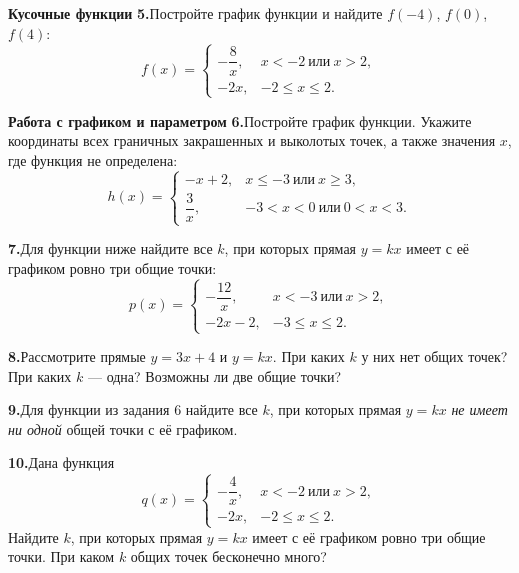 \documentclass[a4paper,12pt]{article}
\newcommand{\task}[2]{\needspace{6\baselineskip}\noindent\textbf{#1.}\enspace #2\par\vspace{9pt}}
\begin{document}
\textbf{Кусочные функции}
\task{5}{Постройте график функции и найдите \(f(-4)\), \(f(0)\), \(f(4)\):
\[
 f(x)=\begin{cases}
 -\dfrac8x,&x<-2\ \text{или}\ x>2,\\[4pt]
 -2x,&-2\le x\le2.
 \end{cases}
\]}

\clearpage
\textbf{Работа с графиком и параметром}
\task{6}{Постройте график функции. Укажите координаты всех граничных закрашенных и выколотых точек, а также значения \(x\), где функция не определена:
\[
 h(x)=\begin{cases}
 -x+2,&x\le-3\ \text{или}\ x\ge3,\\[4pt]
 \dfrac3x,&-3<x<0\ \text{или}\ 0<x<3.
\end{cases}
\]}

\task{7}{Для функции ниже найдите все \(k\), при которых прямая \(y=kx\) имеет с её графиком ровно три общие точки:
\[
 p(x)=\begin{cases}
 -\dfrac{12}{x},&x<-3\ \text{или}\ x>2,\\[4pt]
 -2x-2,&-3\le x\le2.
\end{cases}
\]}

\task{8}{Рассмотрите прямые \(y=3x+4\) и \(y=kx\). При каких \(k\) у них нет общих точек? При каких \(k\) --- одна? Возможны ли две общие точки?}

\task{9}{Для функции из задания 6 найдите все \(k\), при которых прямая \(y=kx\) \emph{не имеет ни одной} общей точки с её графиком.}

\task{10}{Дана функция
\[
 q(x)=\begin{cases}
 -\dfrac4x,&x<-2\ \text{или}\ x>2,\\[4pt]
 -2x,&-2\le x\le2.
\end{cases}
\]
Найдите \(k\), при которых прямая \(y=kx\) имеет с её графиком ровно три общие точки. При каком \(k\) общих точек бесконечно много?}
\end{document}
